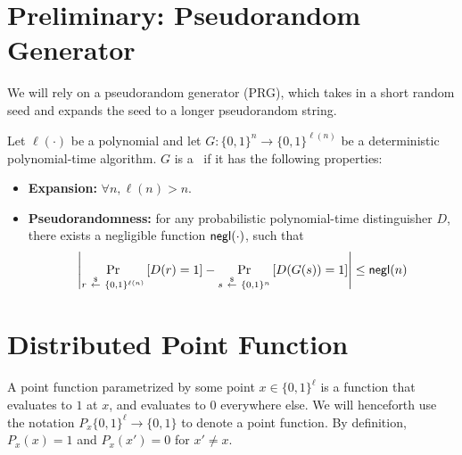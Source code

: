\section{Preliminary: Pseudorandom Generator}
We will rely on a pseudorandom generator (PRG),
which takes in a short random seed and expands
the seed to a longer pseudorandom string.

\begin{definition}[PRG]
    Let $\ell(\cdot)$ be a polynomial and let 
$G:  \{0,1\}^n \rightarrow \{0,1\}^{\ell(n)}$ be a deterministic
    polynomial-time algorithm. $G$ is a \Prg \ if it has the following properties:
    \hfill
    \begin{itemize}
        \item \textbf{Expansion:} $\forall n, \ell(n) > n$.
        \item \textbf{Pseudorandomness:} for any probabilistic polynomial-time distinguisher
$D$, there exists a negligible function ${\sf negl}(\cdot)$, 
such that 
        $$\left|\Pr_{r ~{\overset{\$}{\leftarrow}}~ \{0, 1\}^{\ell(n)}}\left[D(r) = 1\right] - 
\Pr_{s ~{\overset{\$}{\leftarrow}}~ \{0, 1\}^{n}}\left[D(G(s)) = 1\right]\right| \leq {\sf negl}(n)$$ 
    \end{itemize}
\end{definition}

\section{Distributed Point Function}

\begin{definition}
A point function parametrized by some point $x \in \{0, 1\}^\ell$ 
is a function that evaluates to $1$ at $x$, and evaluates to $0$ 
everywhere else.
We will henceforth use the notation $P_x \{0,1\}^{\ell} \rightarrow \{0,1\}$
to denote a point function. 
By definition, $P_x(x) = 1$ and $P_x(x') = 0$ for $x' \neq x$.
\end{definition}

